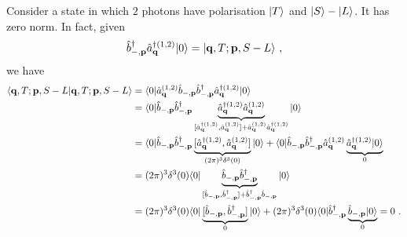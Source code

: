     \begin{example}
        Consider a state in which $2$ photons have polarisation $\vert T\rangle$ and $\vert S\rangle - \vert L\rangle$. It has zero norm. In fact, given
        \begin{equation*}
            \hat b_{-, \mathbf p}^\dagger \hat a_{\mathbf q}^{\dagger (1,2)} \vert0\rangle = \vert\mathbf q, T; \mathbf p, S-L\rangle ~,
        \end{equation*}
        we have 
        \begin{equation*}
        \begin{aligned}
            \langle\mathbf q, T; \mathbf p, S-L\vert\mathbf q, T; \mathbf p, S-L\rangle & = \langle0\vert \hat a_{\mathbf q}^{(1,2)} \hat b_{-, \mathbf p} \hat b_{-, \mathbf p}^\dagger \hat a_{\mathbf q}^{\dagger (1,2)} \vert0\rangle \\ & = \langle0\vert \hat b_{-, \mathbf p} \hat b_{-, \mathbf p}^\dagger \underbrace{\hat a_{\mathbf q}^{\dagger (1,2)} \hat a_{\mathbf q}^{(1,2)}}_{[\hat a_{\mathbf q}^{\dagger (1,2)} , \hat a_{\mathbf q}^{(1,2)}] + \hat a_{\mathbf q}^{(1,2)} \hat a_{\mathbf q}^{\dagger (1,2)}} \vert0\rangle \\ & = \langle0\vert \hat b_{-, \mathbf p} \hat b_{-, \mathbf p}^\dagger \underbrace{[\hat a_{\mathbf q}^{\dagger (1,2)} , \hat a_{\mathbf q}^{(1,2)}] }_{(2\pi)^3 \delta^3 (0) } \vert0\rangle + \langle0\vert \hat b_{-, \mathbf p} \hat b_{-, \mathbf p}^\dagger \hat a_{\mathbf q}^{(1,2)} \underbrace{\hat a_{\mathbf q}^{\dagger (1,2)} \vert0\rangle}_0 \\ & = (2\pi)^3 \delta^3 (0) \langle0\vert \underbrace{\hat b_{-, \mathbf p} \hat b_{-, \mathbf p}^\dagger}_{[\hat b_{-, \mathbf p} , \hat b_{-, \mathbf p}^\dagger] + \hat b_{-, \mathbf p}^\dagger \hat b_{-, \mathbf p}} \vert0\rangle \\ & = (2\pi)^3 \delta^3 (0) \langle0\vert \underbrace{[\hat b_{-, \mathbf p} , \hat b_{-, \mathbf p}^\dagger]}_0 \vert0\rangle + (2\pi)^3 \delta^3 (0) \langle0\vert \hat b_{-, \mathbf p}^\dagger \underbrace{\hat b_{-, \mathbf p} \vert0\rangle}_0 = 0 ~.
        \end{aligned}
        \end{equation*}
    \end{example}
    